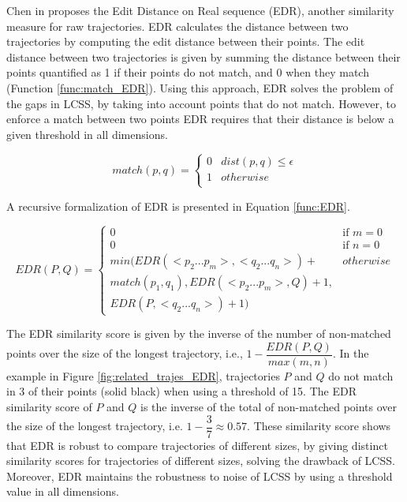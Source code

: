 Chen in \cite{Chen:2005:RFS:1066157.1066213} proposes the Edit Distance on Real sequence (EDR), another similarity measure for raw trajectories. EDR calculates the distance between two trajectories by computing the edit distance between their points. The edit distance between two trajectories is given by summing the distance between their points quantified as 1 if their points do not match, and 0 when they match ({Function} \ref{func:match_EDR}). Using this approach, EDR solves the problem of the gaps in LCSS, by taking into account points that do not match. However, to enforce a match between two points EDR requires that their distance is below a given threshold in all dimensions.

\begin{equation}
\label{func:match_EDR}
  match(p, q) = 
  \begin{cases} 
      0 & dist(p, q) \leq \epsilon \\ 
      1 & otherwise\\
  \end{cases}
\end{equation}

A recursive  formalization of EDR is presented in Equation \ref{func:EDR}.

\begin{equation}
\label{func:EDR}
  EDR(P, Q) = 
  \begin{cases} 
      0 & \text{if } m = 0\\ 
      0 & \text{if } n = 0\\ 
      min(EDR(<p_2...p_m>,<q_2...q_n>) +  & otherwise\\
      match(p_1, q_1), EDR(<p_2...p_m>, Q) + 1, \\
      EDR(P, <q_2...q_n>) + 1) &
  \end{cases}
\end{equation}

The EDR similarity score is given by the inverse of the number of non-matched points over the size of the longest trajectory, i.e., $1 - \dfrac{EDR(P, Q)}{max(m, n)}$. In the example in Figure \ref{fig:related_trajes_EDR}, trajectories $P$ and $Q$ do not match in 3 of their points (solid black) when using a threshold of 15. The EDR similarity score of $P$ and $Q$ is the inverse of the total of non-matched points over the size of the longest trajectory, i.e. $1 - \dfrac{3}{7} \approx 0.57$.
These similarity score shows that EDR is robust to compare trajectories of different sizes, by giving distinct similarity scores for trajectories of different sizes, solving the drawback of LCSS. Moreover, EDR maintains the robustness to noise of LCSS by using a threshold value in all dimensions.

